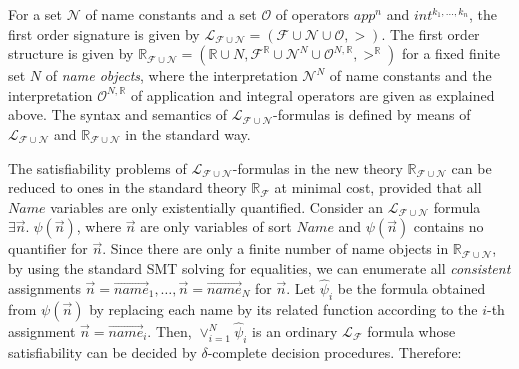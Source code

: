 \begin{definition}
For a  set $\mathcal{N}$ of name constants
and a set  $\mathcal{O}$ of operators  $\mathit{app}^n$ and  $\mathit{int}^{k_1,\ldots,k_n}$,
the first order signature is given by 
$\mathcal{L}_{\mathcal{F}\cup\mathcal{N}} = (\mathcal{F} \cup \mathcal{N} \cup \mathcal{O}, >)$.
%
The first order structure is given by
$\mathbb{R}_{\mathcal{F}\cup\mathcal{N}} 
= (\mathbb{R} \cup N, \mathcal{F}^\mathbb{R} \cup \mathcal{N}^N \cup \mathcal{O}^{N,\mathbb{R}}, >^\mathbb{R})$
for a fixed finite set $N$ of \emph{name objects},
where the interpretation $\mathcal{N}^N$ of name constants and 
the interpretation $\mathcal{O}^{N,\mathbb{R}}$ of application and integral operators 
are given as explained above.
%
The syntax and semantics of $\mathcal{L}_{\mathcal{F}\cup\mathcal{N}}$-formulas 
is defined by means of $\mathcal{L}_{\mathcal{F}\cup\mathcal{N}}$ and $\mathbb{R}_{\mathcal{F}\cup\mathcal{N}}$
in the standard way.
\end{definition}




The satisfiability problems of $\mathcal{L}_{\mathcal{F}\cup\mathcal{N}}$-formulas in the new theory 
$\mathbb{R}_{\mathcal{F}\cup\mathcal{N}}$
can be reduced to ones in the standard theory $\mathbb{R}_\mathcal{F}$ at minimal cost,
provided that all $\mathit{Name}$ variables %
are only existentially quantified.
Consider an $\mathcal{L}_{\mathcal{F}\cup\mathcal{N}}$ formula 
$\exists \vec{n}.\; \psi(\vec{n})$, where 
$\vec{n}$ are only variables of sort $\mathit{Name}$ %
and
$\psi(\vec{n})$ contains no quantifier for $\vec{n}$.
Since there are only a finite number of name objects in $\mathbb{R}_{\mathcal{F}\cup\mathcal{N}}$,
by using the standard SMT solving for equalities,
we can enumerate all \emph{consistent} assignments 
$\vec{n} = \overrightarrow{\mathit{name}}_1,\ldots,\vec{n} = \overrightarrow{\mathit{name}}_N$ for $\vec{n}$.
Let $\hat{\psi}_i$ be the formula obtained from $\psi(\vec{n})$
by replacing each name by its related function according to the $i$-th assignment $\vec{n} = \overrightarrow{\mathit{name}}_i$.
Then, $\vee_{i=1}^N \hat{\psi}_i$ is an ordinary $\mathcal{L}_\mathcal{F}$ formula
whose satisfiability can be decided by %
$\delta$-complete decision procedures. Therefore:


